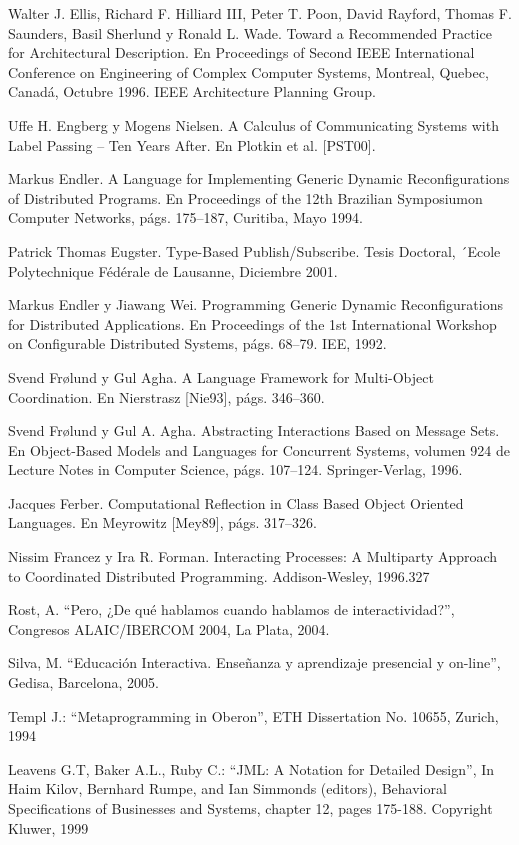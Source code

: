 \begin{thebibliography}{1}
{\bibitem{}
Walter J. Ellis, Richard F. Hilliard III, Peter T. Poon, David
Rayford, Thomas F. Saunders, Basil Sherlund y Ronald L. Wade. Toward a
Recommended Practice for Architectural Description. En Proceedings of Second
IEEE International Conference on Engineering of Complex Computer Systems,
Montreal, Quebec, Canadá, Octubre 1996. IEEE Architecture Planning Group.


\bibitem{}
Uffe H. Engberg y Mogens Nielsen. A Calculus of Communicating Systems
with Label Passing – Ten Years After. En Plotkin et al. [PST00].

\bibitem{} 
Markus Endler. A Language for Implementing Generic Dynamic
Reconfigurations of Distributed Programs. En Proceedings of the 12th Brazilian
Symposiumon Computer Networks, págs. 175–187, Curitiba, Mayo 1994.

\bibitem{}
Patrick Thomas Eugster. Type-Based Publish/Subscribe. Tesis Doctoral,
´Ecole Polytechnique Fédérale de Lausanne, Diciembre 2001.

\bibitem{}
Markus Endler y Jiawang Wei. Programming Generic Dynamic
Reconfigurations for Distributed Applications. En Proceedings of the 1st
International Workshop on Configurable Distributed Systems, págs. 68–79.
IEE, 1992.

\bibitem{} Svend Frølund y Gul Agha. A Language Framework for Multi-Object
Coordination. En Nierstrasz [Nie93], págs. 346–360.

\bibitem{} Svend Frølund y Gul A. Agha. Abstracting Interactions Based on
Message Sets. En Object-Based Models and Languages for Concurrent Systems,
volumen 924 de Lecture Notes in Computer Science, págs. 107–124.
Springer-Verlag, 1996.

\bibitem{} 
Jacques Ferber. Computational Reflection in Class Based Object Oriented
Languages. En Meyrowitz [Mey89], págs. 317–326.

\bibitem{}
Nissim Francez y Ira R. Forman. Interacting Processes: A Multiparty Approach to
Coordinated Distributed Programming. Addison-Wesley, 1996.327

Rost, A. “Pero, ¿De qué hablamos cuando hablamos de interactividad?”,
Congresos ALAIC/IBERCOM 2004, La Plata, 2004.

Silva, M. “Educación Interactiva. Enseñanza y aprendizaje presencial y
on-line”, Gedisa, Barcelona, 2005.


Templ J.: “Metaprogramming in Oberon”, ETH Dissertation No.
10655, Zurich, 1994


 Leavens G.T, Baker A.L., Ruby C.: “JML: A Notation for
Detailed Design”, In Haim Kilov, Bernhard Rumpe, and Ian Simmonds
(editors), Behavioral Specifications of Businesses and Systems,
chapter 12, pages 175-188. Copyright Kluwer, 1999

}
\end{thebibliography}
